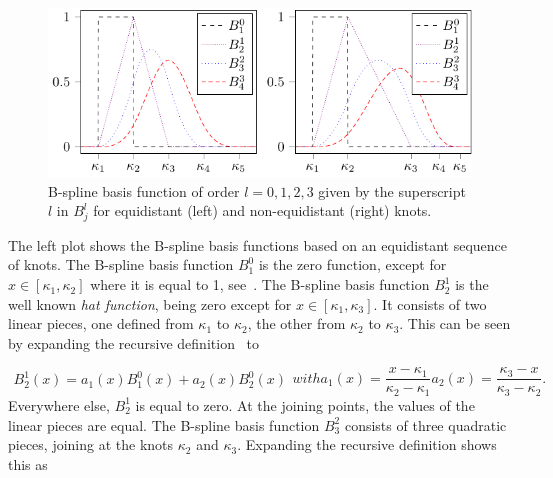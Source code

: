 \begin{figure}[H]
	\centering
	\includegraphics{graphics/pgfplots/cha2/spline-types.pdf}
	\caption{B-spline basis function of order $l=0, 1, 2, 3$ given by the superscript $l$ in $B_j^l$ for equidistant (left) and non-equidistant (right) knots.}
	\label{fig:spline-types-both}
\end{figure}

The left plot shows the B-spline basis functions based on an equidistant sequence of knots. The B-spline basis function $B_1^0$ is the zero function, except for $x \in [\kappa_1, \kappa_2]$ where it is equal to 1, see~. The B-spline basis function $B_2^1$ is the well known \emph{hat function}, being zero except for $x \in [\kappa_1, \kappa_3]$. It consists of two linear pieces, one defined from $\kappa_1$ to $\kappa_2$, the other from $\kappa_2$ to $\kappa_3$. This can be seen by expanding the recursive definition~ to

\begin{subequations} \label{eq:Bspline-BF_21}
	\begin{align}
		B_2^1(x) = a_1(x) B_1^0(x) + a_2(x) B_2^0(x)
	\end{align}
	with
	\begin{equation}
		a_1(x) = \frac{x - \kappa_1}{\kappa_2 - \kappa_1} 
	\end{equation}
	\begin{equation}
		a_2(x) = \frac{\kappa_3 - x}{\kappa_3 - \kappa_2}. 
	\end{equation}
\end{subequations}
%
Everywhere else, $B_2^1$ is equal to zero. At the joining points, the values of the linear pieces are equal. The B-spline basis function $B_3^2$ consists of three quadratic pieces, joining at the knots $\kappa_2$ and $\kappa_3$. Expanding the recursive definition shows this as

